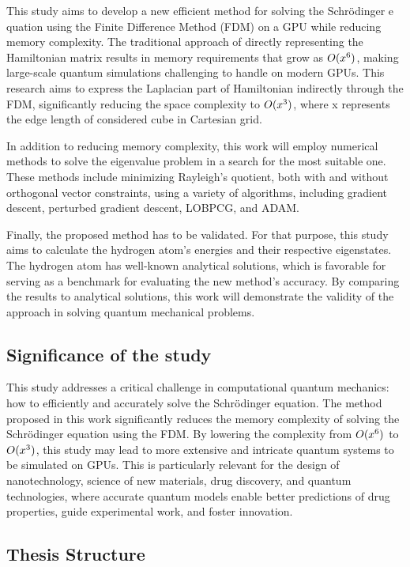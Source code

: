 This study aims to develop a new efficient method for solving the Schrödinger e	quation using the Finite Difference Method (FDM) on a GPU while reducing memory complexity. The traditional approach of directly representing the Hamiltonian matrix results in memory requirements that grow as $O(x\textsuperscript{6})$, making large-scale quantum simulations challenging to handle on modern GPUs. This research aims to express the Laplacian part of Hamiltonian indirectly through the FDM, significantly reducing the space complexity to $O(x\textsuperscript{3})$, where x represents the edge length of considered cube in Cartesian grid.

In addition to reducing memory complexity, this work will employ numerical methods to solve the eigenvalue problem in a search for the most suitable one. These methods include minimizing Rayleigh's quotient, both with and without orthogonal vector constraints, using a variety of algorithms, including gradient descent, perturbed gradient descent, LOBPCG, and ADAM.

Finally, the proposed method has to be validated. For that purpose, this study aims to calculate the hydrogen atom's energies and their respective eigenstates. The hydrogen atom has well-known analytical solutions, which is favorable for serving as a benchmark for evaluating the new method's accuracy. By comparing the results to analytical solutions, this work will demonstrate the validity of the approach in solving quantum mechanical problems.

\subsection{Significance of the study}

This study addresses a critical challenge in computational quantum mechanics: how to efficiently and accurately solve the Schrödinger equation. The method proposed in this work significantly reduces the memory complexity of solving the Schrödinger equation using the FDM. By lowering the complexity from $O(x\textsuperscript{6})$ to $O(x\textsuperscript{3})$, this study may lead to more extensive and intricate quantum systems to be simulated on GPUs. This is particularly relevant for the design of nanotechnology, science of new materials, drug discovery, and quantum technologies, where accurate quantum models enable better predictions of drug properties, guide experimental work, and foster innovation.

\subsection{Thesis Structure}

